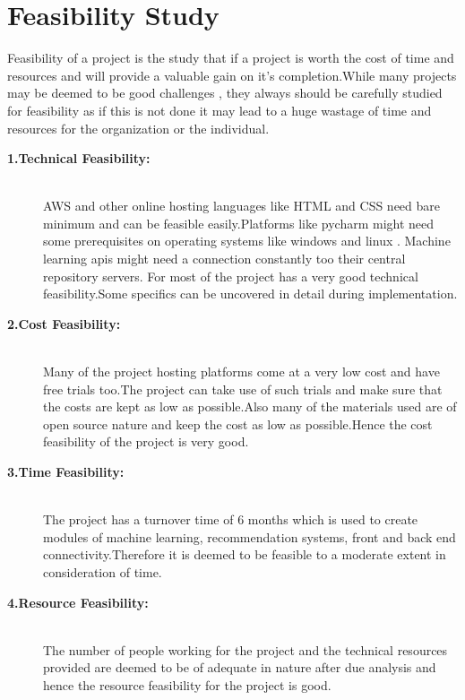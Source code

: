 \documentclass[a4paper,12pt]{report}
\begin{document}
\section{Feasibility Study}

     \par Feasibility of a project is the study that if a project is worth the cost of time and resources and will provide a valuable gain on it’s completion.While many projects may be deemed to be good challenges , they always should be carefully studied for feasibility as if this is not done it may lead to a huge wastage of time and resources for the organization or the individual.
\begin{description}

  \item[\textbf{1.Technical Feasibility:} ] \hfill \\
  AWS and other online hosting languages like HTML and CSS need bare minimum and can be feasible easily.Platforms like pycharm might need some prerequisites on operating systems like windows and linux . Machine learning apis might need a connection constantly too their central repository servers. For most of the project has a very good technical feasibility.Some specifics can be uncovered in detail during implementation.

  \item[\textbf{2.Cost Feasibility:} ] \hfill \\
  Many of the project hosting platforms come at a very low cost and have free trials too.The project can take use of such trials and make sure that the costs are kept as low as possible.Also many of the materials used are of open source nature and keep the cost as low as possible.Hence the cost feasibility of the project is very good.

  \item[\textbf{3.Time Feasibility:} ] \hfill \\
  The project has a turnover time of 6 months which is used to create modules of machine learning, recommendation systems, front and back end connectivity.Therefore it is deemed to be feasible to a moderate extent in consideration of time.

  \item[\textbf{4.Resource Feasibility:} ] \hfill \\
  The number of people working for the project and the technical resources provided are deemed to be of adequate in nature after due analysis and hence the resource feasibility for the project is good.\\


\end{description}
\end{document}
